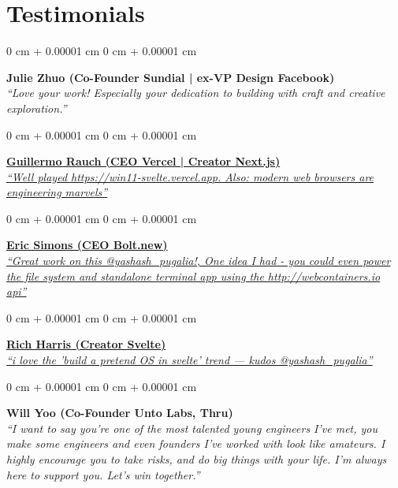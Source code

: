 \documentclass[10pt, a4paper]{article}
\newenvironment{onecolentry}{ \begin{adjustwidth}{ 0 cm + 0.00001 cm }{ 0 cm + 0.00001 cm }
}{ \end{adjustwidth} } %
\begin{document}
	\section{Testimonials}

	\begin{onecolentry}
		\textbf{Julie Zhuo (Co-Founder Sundial | ex-VP Design Facebook)} \\ \textit{``Love
		your work! Especially your dedication to building with craft and creative exploration.''}
	\end{onecolentry}

	\vspace{0.2 cm}

	\begin{onecolentry}
		\href{https://x.com/rauchg/status/1656493176088150017}{\textbf{Guillermo
		Rauch (CEO Vercel | Creator Next.js)} \\ \textit{``Well played https://win11-svelte.vercel.app.
		Also: modern web browsers are engineering marvels''} {\small \faLink}}
	\end{onecolentry}

	\vspace{0.2 cm}

	\begin{onecolentry}
		\href{https://x.com/EricSimons/status/1656644824190308352}{\textbf{Eric
		Simons (CEO Bolt.new)} \\ \textit{``Great work on this @yashash\_pugalia!,
		One idea I had - you could even power the file system and standalone
		terminal app using the http://webcontainers.io api''} {\small \faLink}}
	\end{onecolentry}

	\vspace{0.2 cm}

	\begin{onecolentry}
		\href{https://x.com/Rich_Harris/status/1657097805733715987}{\textbf{Rich
		Harris (Creator Svelte)} \\ \textit{``i love the 'build a pretend OS in svelte'
		trend --- kudos @yashash\_pugalia''} {\small \faLink}}
	\end{onecolentry}

	\vspace{0.2 cm}

	\begin{onecolentry}
		\textbf{Will Yoo (Co-Founder Unto Labs, Thru)} \\ \textit{``I want to say
		you're one of the most talented young engineers I've met, you make some engineers
		and even founders I've worked with look like amateurs. I highly encourage
		you to take risks, and do big things with your life. I'm always here to
		support you. Let's win together.''}
	\end{onecolentry}
\end{document}
